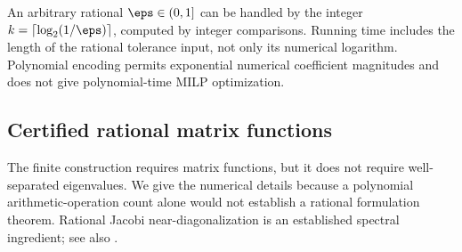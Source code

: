 An arbitrary rational $\eps\in(0,1]$ can be handled by the integer
$k=\lceil\log_2(1/\eps)\rceil$, computed by integer comparisons. Running
time includes the length of the rational tolerance input, not only its
numerical logarithm. Polynomial encoding permits exponential numerical
coefficient magnitudes and does not give polynomial-time MILP optimization.

\subsection{Certified rational matrix functions}\label{subsec:matrix-functions}

The finite construction requires matrix functions, but it does not require
well-separated eigenvalues. We give the numerical details because a
polynomial arithmetic-operation count alone would not establish a rational
formulation theorem. Rational Jacobi near-diagonalization is an established
spectral ingredient; see also \citet[Theorem 2]{delpia2026}.

